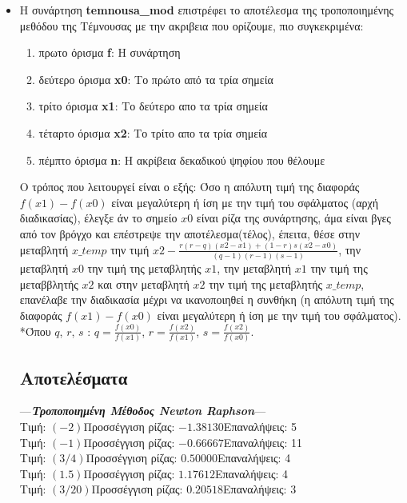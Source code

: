 \documentclass[a4paper,11pt]{article}
\newcommand{\lt}{\latintext}
\newcommand{\gt}{\greektext}
\begin{document}
\begin{flushleft}
\begin{itemize}
	
	\item Η συνάρτηση \lt \textbf{temnousa\_mod} \gt επιστρέφει το αποτέλεσμα της τροποποιημένης μεθόδου της Τέμνουσας με την ακριβεια που ορίζουμε, πιο συγκεκριμένα:\linebreak 
	\begin{enumerate}
\item πρωτο όρισμα \lt \textbf{f}: \gt Η συνάρτηση
\item δεύτερο όρισμα \lt \textbf{x0}: \gt Το πρώτο από τα τρία σημεία 
\item \gt τρίτο όρισμα \lt \textbf{x1}: \gt Το δεύτερο απο τα τρία σημεία
\item \gt τέταρτο όρισμα \lt \textbf{x2}: \gt Το τρίτο απο τα τρία σημεία
\item \gt πέμπτο όρισμα \lt \textbf{n}: \gt Η ακρίβεια δεκαδικού ψηφίου που θέλουμε
\end{enumerate}
Ο τρόπος που λειτουργεί είναι ο εξής:\linebreak 
	Όσο η απόλυτη τιμή της διαφοράς $f(x1)-f(x0)$ είναι μεγαλύτερη ή ίση με την τιμή του σφάλματος (αρχή διαδικασίας), έλεγξε άν το σημείο $x0$ είναι ρίζα της συνάρτησης, άμα είναι βγες από τον βρόγχο και επέστρεψε την αποτέλεσμα(τέλος),\linebreak
	έπειτα, θέσε στην μεταβλητή $x\_temp$ την τιμή $x2 - \frac{r(r-q)(x2-x1)+(1-r)s(x2-x0)}{(q-1)(r-1)(s-1)}$, την μεταβλητή $x0$ την τιμή της μεταβλητής $x1$, την μεταβλητή $x1$ την τιμή της μεταββλητής $x2$ και στην μεταβλητή $x2$ την τιμή της μεταβλητής $x\_temp$, επανέλαβε την διαδικασία μέχρι να ικανοποιηθεί η συνθήκη (η απόλυτη τιμή της διαφοράς $f(x1)-f(x0)$ είναι μεγαλύτερη ή ίση με την τιμή του σφάλματος). *Όπου $q$, $r$, $s$ : $q=\frac{f(x0)}{f(x1)}$, $r=\frac{f(x2)}{f(x1)}$, $s=\frac{f(x2)}{f(x0)}$.
	\pagebreak
	\subsection{Αποτελέσματα}
\medskip 

---\emph{\textbf{Τροποποιημένη Μέθοδος \lt Newton Raphson\gt}}---\\
Τιμή: $(-2)$\quad      Προσσέγγιση ρίζας: $-1.38130$\quad 	Επαναλήψεις: 5\\
Τιμή: $(-1)$\quad	  Προσσέγγιση ρίζας: $-0.66667$\quad 	Επαναλήψεις: 11\\
Τιμή: $(3/4)$\quad	  Προσσέγγιση ρίζας: $0.50000$\quad 	Επαναλήψεις: 4\\
Τιμή: $(1.5)$\quad	  Προσσέγγιση ρίζας: $1.17612$\quad 	Επαναλήψεις: 4\\
Τιμή: $(3/20)$\quad	  Προσσέγγιση ρίζας: $0.20518$\quad 	Επαναλήψεις: 3\\
\bigskip 


\end{itemize}
\end{flushleft}
\end{document}
